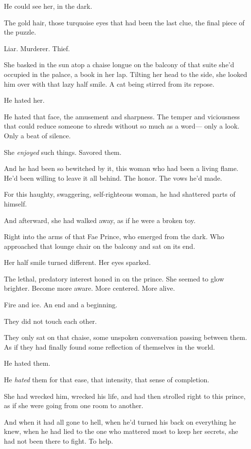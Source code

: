 He could see her, in the dark.

The gold hair, those turquoise eyes that had been the last clue, the final piece of the puzzle.

Liar. Murderer. Thief.

She basked in the sun atop a chaise longue on the balcony of that suite she'd occupied in the palace, a book in her lap. Tilting her head to the side, she looked him over with that lazy half smile. A cat being stirred from its repose.

He hated her.

He hated that face, the amusement and sharpness. The temper and viciousness that could reduce someone to shreds without so much as a word--- only a look. Only a beat of silence.

She \emph{enjoyed} such things. Savored them.

And he had been so bewitched by it, this woman who had been a living flame. He'd been willing to leave it all behind. The honor. The vows he'd made.

For this haughty, swaggering, self-righteous woman, he had shattered parts of himself.

And afterward, she had walked away, as if he were a broken toy.

Right into the arms of that Fae Prince, who emerged from the dark. Who approached that lounge chair on the balcony and sat on its end.

Her half smile turned different. Her eyes sparked.

The lethal, predatory interest honed in on the prince. She seemed to glow brighter. Become more aware. More centered. More  alive.

Fire and ice. An end and a beginning.

They did not touch each other.

They only sat on that chaise, some unspoken conversation passing between them. As if they had finally found some reflection of themselves in the world.

He hated them.

He \emph{hated} them for that ease, that intensity, that sense of completion.

She had wrecked him, wrecked his life, and had then strolled right to this prince, as if she were going from one room to another.

And when it had all gone to hell, when he'd turned his back on everything he knew, when he had lied to the one who mattered most to keep her secrets, she had not been there to fight. To help.

